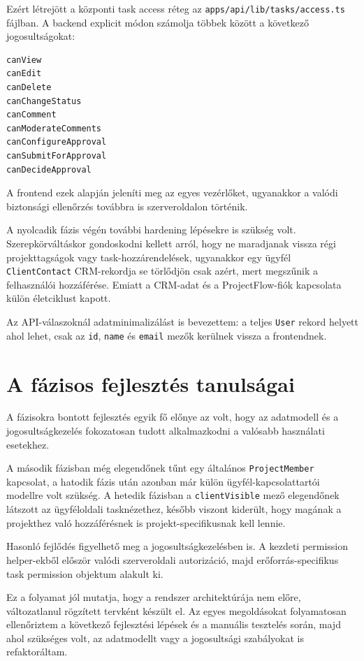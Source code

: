 \documentclass[11pt,a4paper]{report}
\begin{document}
    Ezért létrejött a központi task access réteg az
    \texttt{apps/api/lib/tasks/access.ts} fájlban. A backend explicit módon
    számolja többek között a következő jogosultságokat:

    \begin{lstlisting}
canView
canEdit
canDelete
canChangeStatus
canComment
canModerateComments
canConfigureApproval
canSubmitForApproval
canDecideApproval
    \end{lstlisting}

    A frontend ezek alapján jeleníti meg az egyes vezérlőket, ugyanakkor a valódi
    biztonsági ellenőrzés továbbra is szerveroldalon történik.

    A nyolcadik fázis végén további hardening lépésekre is szükség volt.
    Szerepkörváltáskor gondoskodni kellett arról, hogy ne maradjanak vissza régi
    projekttagságok vagy task-hozzárendelések, ugyanakkor egy ügyfél
    \texttt{ClientContact} CRM-rekordja se törlődjön csak azért, mert megszűnik a
    felhasználói hozzáférése. Emiatt a CRM-adat és a ProjectFlow-fiók kapcsolata
    külön életciklust kapott.

    Az API-válaszoknál adatminimalizálást is bevezettem: a teljes
    \texttt{User} rekord helyett ahol lehet, csak az
    \texttt{id}, \texttt{name} és \texttt{email} mezők kerülnek vissza a
    frontendnek.

    \section{A fázisos fejlesztés tanulságai}

    A fázisokra bontott fejlesztés egyik fő előnye az volt, hogy az adatmodell és a
    jogosultságkezelés fokozatosan tudott alkalmazkodni a valósabb használati
    esetekhez.

    A második fázisban még elegendőnek tűnt egy általános
    \texttt{ProjectMember} kapcsolat, a hatodik fázis után azonban már külön
    ügyfél-kapcsolattartói modellre volt szükség. A hetedik fázisban a
    \texttt{clientVisible} mező elegendőnek látszott az ügyféloldali tasknézethez,
    később viszont kiderült, hogy magának a projekthez való hozzáférésnek is
    projekt-specifikusnak kell lennie.

    Hasonló fejlődés figyelhető meg a jogosultságkezelésben is. A kezdeti
    permission helper-ekből először valódi szerveroldali autorizáció, majd
    erőforrás-specifikus task permission objektum alakult ki.

    Ez a folyamat jól mutatja, hogy a rendszer architektúrája nem előre,
    változatlanul rögzített tervként készült el. Az egyes megoldásokat folyamatosan
    ellenőriztem a következő fejlesztési lépések és a manuális tesztelés során,
    majd ahol szükséges volt, az adatmodellt vagy a jogosultsági szabályokat is
    refaktoráltam.
\end{document}
